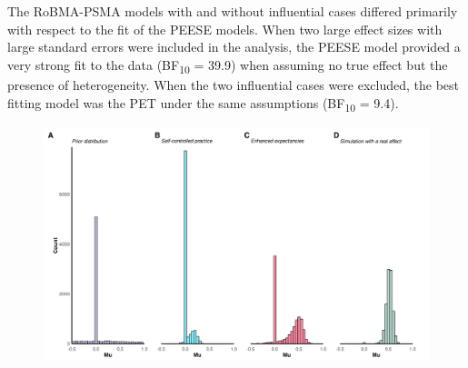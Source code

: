 \documentclass[
  man, donotrepeattitle,floatsintext]{apa7}
\begin{document}
The RoBMA-PSMA models with and without influential cases differed primarily with respect to the fit of the PEESE models. When two large effect sizes with large standard errors were included in the analysis, the PEESE model provided a very strong fit to the data (BF\textsubscript{10} = 39.9) when assuming no true effect but the presence of heterogeneity. When the two influential cases were excluded, the best fitting model was the PET under the same assumptions (BF\textsubscript{10} = 9.4).

\clearpage

\begin{figure}

{\centering \includegraphics{../../figs/fig2} 

}


\end{figure}
\end{document}
